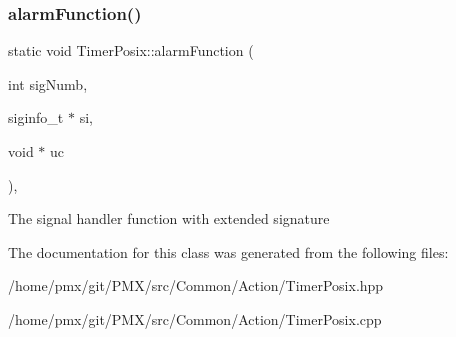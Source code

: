 \subsubsection{\texorpdfstring{alarm\+Function()}{alarmFunction()}}
{\footnotesize\ttfamily static void Timer\+Posix\+::alarm\+Function (\begin{DoxyParamCaption}\item[{int}]{sig\+Numb,  }\item[{siginfo\+\_\+t $\ast$}]{si,  }\item[{void $\ast$}]{uc }\end{DoxyParamCaption})\hspace{0.3cm}{\ttfamily [inline]}, {\ttfamily [static]}}

The signal handler function with extended signature 

The documentation for this class was generated from the following files\+:\begin{DoxyCompactItemize}
\item 
/home/pmx/git/\+P\+M\+X/src/\+Common/\+Action/Timer\+Posix.\+hpp\item 
/home/pmx/git/\+P\+M\+X/src/\+Common/\+Action/Timer\+Posix.\+cpp\end{DoxyCompactItemize}
